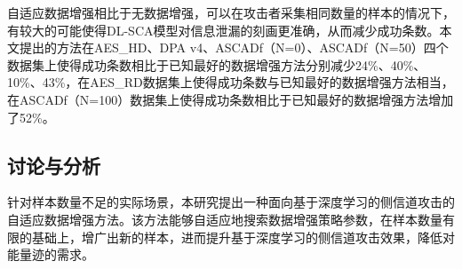 {	自适应数据增强相比于无数据增强，可以在攻击者采集相同数量的样本的情况下，有较大的可能使得DL-SCA模型对信息泄漏的刻画更准确，从而减少成功条数。本文提出的方法在AES\_HD、DPA v4、ASCADf（N=0）、ASCADf（N=50）四个数据集上使得成功条数相比于已知最好的数据增强方法分别减少24\%、40\%、10\%、43\%，在AES\_RD数据集上使得成功条数与已知最好的数据增强方法相当，在ASCADf（N=100）数据集上使得成功条数相比于已知最好的数据增强方法增加了52\%。
	\subsection{讨论与分析}
	{\color{\dupc}
		针对样本数量不足的实际场景，本研究提出一种面向基于深度学习的侧信道攻击的自适应数据增强方法。该方法能够自适应地搜索数据增强策略参数，在样本数量有限的基础上，增广出新的样本，进而提升基于深度学习的侧信道攻击效果，降低对能量迹的需求。


	}
}